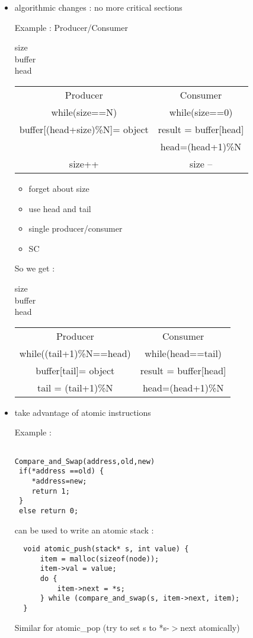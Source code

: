 \documentclass[a4paper,10pt]{article}
\begin{document}
\begin{itemize}
  \item algorithmic changes : no more critical sections
  
  Example : Producer/Consumer
  
  \begin{center}
size\\buffer\\head

      \begin{tabular}{c|c}
        Producer & Consumer\\
        while(size==N) {} & while(size==0) {}\\
        buffer[(head+size)\%N]= object & result = buffer[head]\\
         & head=(head+1)\%N \\        
        size++ & size -- \\
      \end{tabular}
    \end{center}
  
  
  \begin{itemize}
    \item forget about size
    \item use head and tail
    \item single producer/consumer
    \item SC
  \end{itemize}

So we get :
\begin{center}
size\\buffer\\head

      \begin{tabular}{c|c}
        Producer & Consumer\\
        while((tail+1)\%N==head) {} & while(head==tail) {}\\
        buffer[tail]= object & result = buffer[head]\\
        tail = (tail+1)\%N & head=(head+1)\%N \\        
      \end{tabular}
    \end{center}    

\item take advantage of atomic instructions

Example : 
\begin{verbatim}

Compare_and_Swap(address,old,new)
 if(*address ==old) {
    *address=new;
    return 1;
 }
 else return 0;
\end{verbatim}
can be used to write an atomic stack :

\begin{verbatim}
  void atomic_push(stack* s, int value) {
      item = malloc(sizeof(node));
      item->val = value;
      do {
          item->next = *s;
      } while (compare_and_swap(s, item->next, item);
  }
\end{verbatim}

Similar for atomic\_pop (try to set s to *s-$>$next atomically)

\end{itemize}
\end{document}
